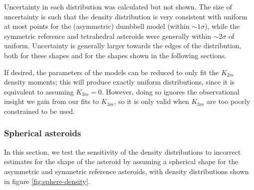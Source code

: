 \documentclass[fleqn,usenatbib]{mnras}
\begin{document}
Uncertainty in each distribution was calculated but not shown. The size of uncertainty is such that the density distribution is very consistent with uniform at most points for the (asymmetric) dumbbell model (within $\sim 1\sigma$), while the symmetric reference and tetrahedral asteroids were generally within $\sim 2 \sigma$ of uniform. Uncertainty is generally larger towards the edges of the distribution, both for these shapes and for the shapes shown in the following sections.

If desired, the parameters of the models can be reduced to only fit the $K_{2m}$ density moments; this will produce exactly uniform distributions, since it is equivalent to assuming $K_{3m}=0$. However, doing so ignores the observational insight we gain from our fits to $K_{3m}$, so it is only valid when $K_{3m}$ are too poorly constrained to be used. 

\subsubsection{Spherical asteroids}
\label{sec:spherical-density}
In this section, we test the sensitivity of the density distributions to incorrect estimates for the shape of the asteroid by assuming a spherical shape for the asymmetric and symmetric reference asteroids, with density distributions shown in figure \ref{fig:sphere-density}.
\end{document}
